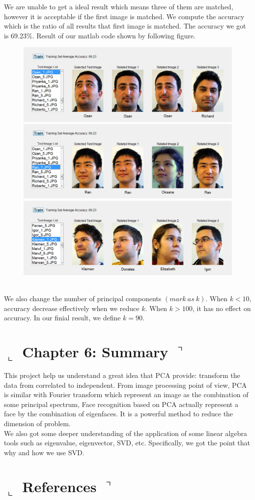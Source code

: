 \documentclass[]{article}
\begin{document}
We are unable to get a ideal result which means three of them are matched, however it is acceptable if the first image is matched. We compute the accuracy which is the ratio of all results that first image is matched. The accuracy we got is 69.23$ \% $. Result of our matlab code shown by following figure.
\begin{figure}[h]
\centering
\includegraphics[width=0.7\linewidth]{./PCA2.png}
\includegraphics[width=0.7\linewidth]{./PCA4.png}
\includegraphics[width=0.7\linewidth]{./PCA5.png}
\caption{}
\end{figure}
\\

We also change the number of principal components $ (mark \ as \ k ) $. When $ k < 10 $, accuracy decrease effectively when we reduce $ k $. When $ k > 100 $, it has no effect on accuracy. In our finial result, we define $ k = 90 $.

\section*{ $\llcorner$  Chapter 6: Summary $\urcorner$}

This project help us understand a great idea that PCA provide: transform the data from correlated to independent. From image processing point of view, PCA is similar with Fourier transform which represent an image as the combination of some principal spectrum, Face recognition based on PCA actually represent a face by the combination of eigenfaces. It is a powerful method to reduce the dimension of problem.
\\

We also got some deeper understanding of the application of some linear algebra tools such as eigenvalue, eigenvector, SVD, etc. Specifically, we got the point that why and how we use SVD. 

\section*{ $\llcorner$  References $\urcorner$}
\end{document}
